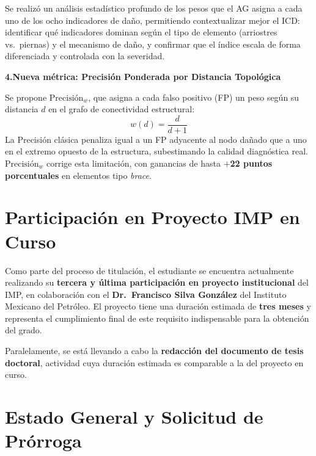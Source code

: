 \documentclass[12pt]{article}
\begin{document}
Se realizó un análisis estadístico profundo de los pesos que el AG asigna a cada uno de los
ocho indicadores de daño, permitiendo contextualizar mejor el ICD: identificar qué indicadores
dominan según el tipo de elemento (arriostres vs.\ piernas) y el mecanismo de daño,
y confirmar que el índice escala de forma diferenciada y controlada con la severidad.

\medskip
\noindent\textbf{4.\enspace Nueva métrica: Precisión Ponderada por Distancia Topológica}

Se propone $\text{Precisión}_w$, que asigna a cada falso positivo (FP) un peso
según su distancia $d$ en el grafo de conectividad estructural:
\[
  w(d) = \frac{d}{d+1}
\]
La Precisión clásica penaliza igual a un FP adyacente al nodo dañado que a uno en el extremo
opuesto de la estructura, subestimando la calidad diagnóstica real. $\text{Precisión}_w$
corrige esta limitación, con ganancias de hasta \textbf{$+$22 puntos porcentuales} en
elementos tipo \textit{brace}.

\section{Participación en Proyecto IMP en Curso}

Como parte del proceso de titulación, el estudiante se encuentra actualmente realizando
su \textbf{tercera y última participación en proyecto institucional} del IMP, en colaboración
con el \textbf{Dr.\ Francisco Silva González} del Instituto Mexicano del Petróleo.
El proyecto tiene una duración estimada de \textbf{tres meses} y representa el cumplimiento
final de este requisito indispensable para la obtención del grado.

Paralelamente, se está llevando a cabo la \textbf{redacción del documento de tesis doctoral},
actividad cuya duración estimada es comparable a la del proyecto en curso.

\section{Estado General y Solicitud de Prórroga}
\end{document}
